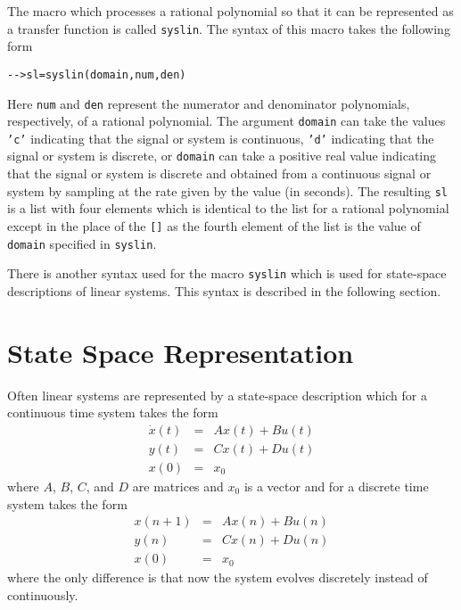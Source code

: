 	The macro which processes a rational polynomial so that
it can be represented as a transfer function is called {\tt syslin}.
The syntax of this macro takes the following form
\begin{verbatim}
-->sl=syslin(domain,num,den)
\end{verbatim}
Here {\tt num} and {\tt den} represent the numerator and denominator
polynomials, respectively, of a rational polynomial.  The 
argument {\tt domain}
can take the values {\tt 'c'} indicating that the signal or system is
continuous, {\tt 'd'} indicating that the signal or system is discrete,
or {\tt domain} can take a positive real value indicating that the
signal or system is discrete and obtained from a continuous signal
or system by sampling at the rate given by the value (in seconds).
The resulting {\tt sl} is a list with four elements which is identical
to the list for a rational polynomial except in the place of the {\tt []}
as the fourth element of the list is the value of {\tt domain}
specified in {\tt syslin}.

	There is another syntax used for the macro {\tt syslin}
which is used for state-space descriptions of linear systems.
This syntax is described in the following section.

\section{State Space Representation}
\label{ssrep}

	Often linear systems are represented by
a state-space description which for a continuous time system takes
the form
\begin{eqnarray}
\dot{x}(t)&=&Ax(t)+Bu(t)\nonumber\\
y(t)&=&Cx(t)+Du(t)\nonumber\\
x(0)&=&x_0\nonumber
\end{eqnarray}
where $A$, $B$, $C$, and $D$ are matrices and $x_0$ is a vector
and for a discrete time system takes the form
\begin{eqnarray}
x(n+1)&=&Ax(n)+Bu(n)\nonumber\\
y(n)&=&Cx(n)+Du(n)\nonumber\\
x(0)&=&x_0\nonumber
\end{eqnarray}
where the only difference is that now the system evolves discretely
instead of continuously.  

